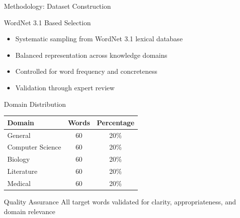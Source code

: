 \documentclass[aspectratio=169]{beamer}
\begin{document}
\begin{frame}{Methodology: Dataset Construction}
\begin{block}{WordNet 3.1 Based Selection}
\begin{itemize}
    \item Systematic sampling from WordNet 3.1 lexical database
    \item Balanced representation across knowledge domains
    \item Controlled for word frequency and concreteness
    \item Validation through expert review
\end{itemize}
\end{block}

\begin{block}{Domain Distribution}
\begin{center}
\begin{tabular}{lcc}
\toprule
\textbf{Domain} & \textbf{Words} & \textbf{Percentage} \\
\midrule
General & 60 & 20\% \\
Computer Science & 60 & 20\% \\
Biology & 60 & 20\% \\
Literature & 60 & 20\% \\
Medical & 60 & 20\% \\
\bottomrule
\end{tabular}
\end{center}
\end{block}

\begin{exampleblock}{Quality Assurance}
All target words validated for clarity, appropriateness, and domain relevance
\end{exampleblock}
\end{frame}
\end{document}
